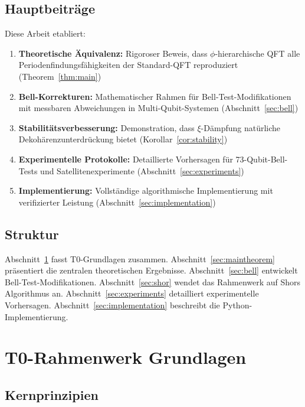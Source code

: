 \subsection{Hauptbeiträge}

Diese Arbeit etabliert:

\begin{enumerate}
	\item \textbf{Theoretische Äquivalenz:} Rigoroser Beweis, dass $\phi$-hierarchische QFT alle Periodenfindungsfähigkeiten der Standard-QFT reproduziert (Theorem~\ref{thm:main})
	\item \textbf{Bell-Korrekturen:} Mathematischer Rahmen für Bell-Test-Modifikationen mit messbaren Abweichungen in Multi-Qubit-Systemen (Abschnitt~\ref{sec:bell})
	\item \textbf{Stabilitätsverbesserung:} Demonstration, dass $\xi$-Dämpfung natürliche Dekohärenzunterdrückung bietet (Korollar~\ref{cor:stability})
	\item \textbf{Experimentelle Protokolle:} Detaillierte Vorhersagen für 73-Qubit-Bell-Tests und Satellitenexperimente (Abschnitt~\ref{sec:experiments})
	\item \textbf{Implementierung:} Vollständige algorithmische Implementierung mit verifizierter Leistung (Abschnitt~\ref{sec:implementation})
\end{enumerate}

\subsection{Struktur}

Abschnitt~\ref{sec:t0framework} fasst T0-Grundlagen zusammen. Abschnitt~\ref{sec:maintheorem} präsentiert die zentralen theoretischen Ergebnisse. Abschnitt~\ref{sec:bell} entwickelt Bell-Test-Modifikationen. Abschnitt~\ref{sec:shor} wendet das Rahmenwerk auf Shors Algorithmus an. Abschnitt~\ref{sec:experiments} detailliert experimentelle Vorhersagen. Abschnitt~\ref{sec:implementation} beschreibt die Python-Implementierung.

\section{T0-Rahmenwerk Grundlagen}
\label{sec:t0framework}

\subsection{Kernprinzipien}

